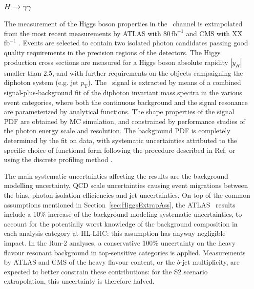 \subsubsection{$H \to \gamma\gamma$}
\label{sec:Hgammagamma}

The measurement of the Higgs boson properties in the \Hyy\ channel is extrapolated from the most recent measurements by ATLAS with 80\,$\mathrm{fb}^{-1}$ \cite{ATLAS:2018uso} and CMS with XX\,$\mathrm{fb}^{-1}$ \cite{}.
Events are selected to contain two isolated photon candidates passing good quality requirements in the precision regions of the detectors.
The Higgs production cross sections are measured for a Higgs boson absolute rapidity $|y_H|$ smaller than 2.5, and with further requirements on the objects campaigning the diphoton system (e.g. jet $p_\mathrm{T}$).
The \Hyy\ signal is extracted by means of a combined signal-plus-background fit of the diphoton invariant mass spectra in the various event categories, where both the continuous background and the signal resonance are parameterized by analytical functions. The shape properties of the signal PDF are obtained by MC simulation, and constrained by performance studies of the photon energy scale and resolution. The background PDF is completely determined by the fit on data, with systematic uncertainties attributed to the specific choice of functional form following the procedure described in Ref. \cite{Aad:2012tfa} or using the discrete profiling method \cite{Dauncey:2014xga}.

The main systematic uncertainties affecting the results are the background modelling uncertainty, QCD scale uncertainties causing event migrations between the bins, photon isolation efficiencies and jet uncertainties.
%
On top of the common assumptions mentioned in Section~\ref{sec:HiggsExtrapAss}, the ATLAS \Hyy\ results include a 10\% increase of the background modeling systematic uncertainties, to account for the potentially worst knowledge of the background composition in each analysis category at HL-LHC: this assumption has anyway negligible impact.
%
In the Run-2 analyses, a conservative 100\% uncertainty on the heavy flavour resonant background in top-sensitive categories is applied. Measurements by ATLAS and CMS of the heavy flavour content, or the $b$-jet multiplicity, are expected to better constrain these contributions: for the S2 scenario extrapolation, this uncertainty is therefore halved.


